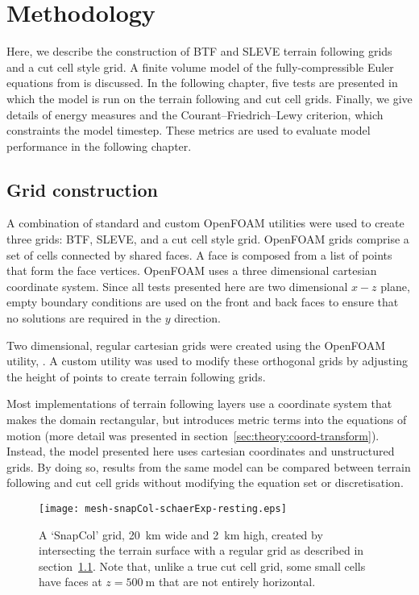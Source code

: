 \chapter{Methodology}
Here, we describe the construction of BTF and SLEVE terrain following grids and a cut cell style grid.  A finite volume model of the fully-compressible Euler equations from \textcite{weller-shahrokhi2014} is discussed.  In the following chapter, five tests are presented in which the model is run on the terrain following and cut cell grids.  Finally, we give details of energy measures and the Courant--Friedrich--Lewy criterion, which constraints the model timestep.  These metrics are used to evaluate model performance in the following chapter.

\section{Grid construction}
\label{sec:method:grid}

A combination of standard and custom OpenFOAM utilities were used to create three grids: BTF, SLEVE, and a cut cell style grid.  OpenFOAM grids comprise a set of cells connected by shared faces.  A face is composed from a list of points that form the face vertices.
OpenFOAM uses a three dimensional cartesian coordinate system.  Since all tests presented here are two dimensional $x-z$ plane, empty boundary conditions are used on the front and back faces to ensure that no solutions are required in the $y$ direction.

Two dimensional, regular cartesian grids were created using the OpenFOAM utility, .  A custom utility was used to modify these orthogonal grids by adjusting the height of points to create terrain following grids.

Most implementations of terrain following layers use a coordinate system that makes the domain rectangular, but introduces metric terms into the equations of motion (more detail was presented in section~\ref{sec:theory:coord-transform}).  Instead, the model presented here uses cartesian coordinates and unstructured grids.  By doing so, results from the same model can be compared between terrain following and cut cell grids without modifying the equation set or discretisation.

\begin{figure}
\centerfloat
\texttt{[image: mesh-snapCol-schaerExp-resting.eps]}
\caption{A `SnapCol' grid, \SI{20}{\kilo\meter} wide and \SI{2}{\kilo\meter} high, created by intersecting the terrain surface with a regular grid as described in section~\ref{sec:method:grid}.  Note that, unlike a true cut cell grid, some small cells have faces at $z = \SI{500}{\meter}$ that are not entirely horizontal.}
\label{fig:method:cut-cell}
\end{figure}

